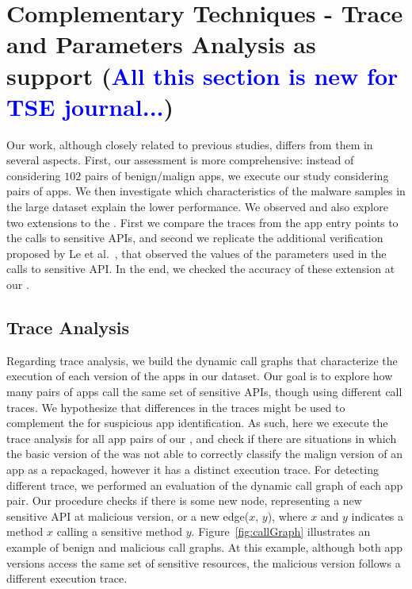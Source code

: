 \section{Complementary Techniques - Trace and Parameters Analysis as \mas support (\textcolor{blue}{All this section is new for TSE journal...})}\label{sec:complementary}


Our work, although closely related to previous studies, differs from them in several aspects.  First, our assessment is more comprehensive: instead of considering $102$ pairs of benign/malign apps, we execute our study considering \apps pairs of apps. We then investigate which characteristics of the malware samples in the large dataset explain the lower performance. We observed and also explore two extensions to the \mas. First we compare the traces from the app entry points to the calls to sensitive APIs, and second we replicate the additional verification proposed by Le et al.~\cite{le2018towards}, that observed the values of the parameters used in the calls to sensitive API. In the end, we checked the accuracy of these extension at our \cds.

\subsection{Trace Analysis}

Regarding trace analysis, we build the dynamic call graphs that characterize the execution of each version of the apps in our dataset. Our goal is to explore how many pairs of apps call the same set of sensitive APIs, though using different call traces. We hypothesize that differences in the traces might be used to complement the \mas for suspicious app identification. As such, here we execute the trace analysis for all app pairs of our \cds, and check if there are situations in which the basic version of the \mas was not able to correctly classify the malign version of an app as a repackaged, however it has a distinct execution trace. For detecting different trace, we performed an evaluation of the dynamic call graph of each app pair. Our procedure checks if there is some new node, representing a new sensitive API at malicious version, or a new edge($x$, $y$), where $x$ and $y$ indicates a method $x$ calling a sensitive method $y$. Figure~\ref{fig:callGraph} illustrates an example of benign and malicious call graphs.
At this example, although both app versions access the same set of sensitive resources, the
malicious version follows a different execution trace. 


